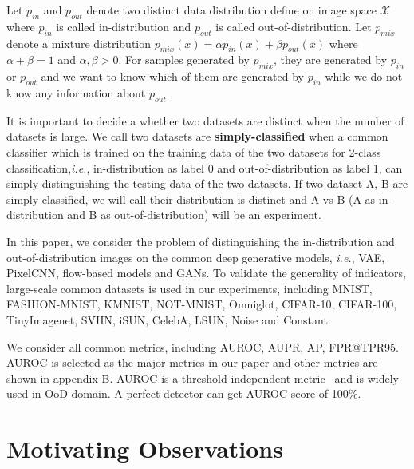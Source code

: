 \documentclass[letterpaper]{article} %
\newcommand{\IE}{\textit{i.e.}, }
\newcommand{\pin}{p_{in}}
\newcommand{\pout}{p_{out}}
\newcommand{\pmix}{p_{mix}}
\begin{document}
Let $\pin$ and $\pout$ denote two distinct data distribution define on image space $\mathcal{X}$ where $\pin$ is called in-distribution and $\pout$ is called out-of-distribution. 
Let $\pmix$ denote a mixture distribution $\pmix(x) = \alpha \pin(x) + \beta \pout(x)$ where $\alpha + \beta = 1$ and $\alpha, \beta > 0$. 
For samples generated by $\pmix$, they are generated by $\pin$ or $\pout$ and we want to know which of them are generated by $\pin$ while we do not know any information about $\pout$. 

It is important to decide a whether two datasets are distinct when the number of datasets is large. We call two datasets are \textbf{simply-classified} when a common classifier which is trained on the training data of the two datasets for 2-class classification,\IE in-distribution as label 0 and out-of-distribution as label 1, can simply distinguishing the testing data of the two datasets. If two dataset A, B are simply-classified, we will call their distribution is distinct and A vs B (A as in-distribution and B as out-of-distribution) will be an experiment. 

In this paper, we consider the problem of distinguishing the in-distribution and out-of-distribution images on the common deep generative models, \IE VAE, PixelCNN, flow-based models and GANs. To validate the generality of indicators, large-scale common datasets is used in our experiments, including MNIST, FASHION-MNIST, KMNIST, NOT-MNIST, Omniglot, CIFAR-10, CIFAR-100, TinyImagenet, SVHN, iSUN, CelebA, LSUN, Noise and Constant. 

We consider all common metrics, including AUROC, AUPR, AP, FPR@TPR95. AUROC is selected as the major metrics in our paper and other metrics are shown in appendix B. AUROC is a threshold-independent metric~\cite{davis2006relationship} and is widely used in OoD domain. A perfect detector can get AUROC score of 100\%. 

\section{Motivating Observations}\label{sec3}
\end{document}
